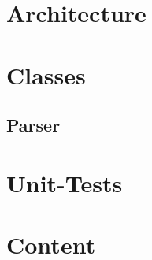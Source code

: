 
\section{Architecture}

\section{Classes}







\subsection{Parser}
\cite{Louden:1997:CCP:523017}

\section{Unit-Tests}

\section{Content}



